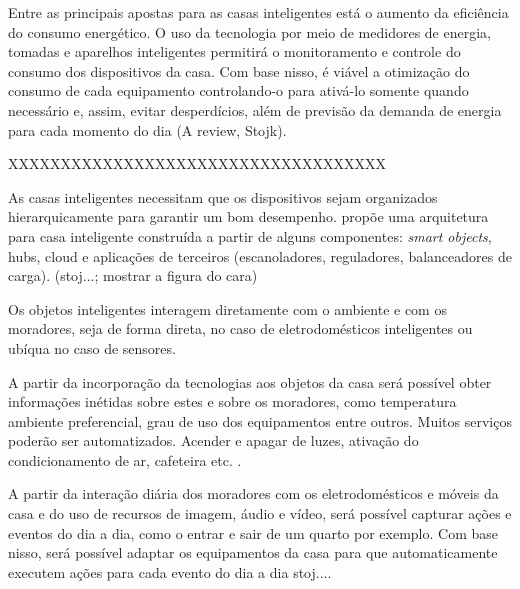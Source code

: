 Entre as principais apostas para as casas inteligentes está o aumento da eficiência do consumo energético. O uso da tecnologia por meio de medidores de energia, tomadas e aparelhos inteligentes permitirá o monitoramento e controle do consumo dos dispositivos da casa. Com base nisso, é viável a otimização do consumo de cada equipamento controlando-o para ativá-lo somente quando necessário e, assim, evitar desperdícios, além de previsão da demanda de energia para cada momento do dia (A review, Stojk).




XXXXXXXXXXXXXXXXXXXXXXXXXXXXXXXXXXXX


As casas inteligentes necessitam que os dispositivos sejam organizados hierarquicamente para garantir um bom desempenho. \citeauthor{stojkoska} propõe uma arquitetura para casa inteligente construída a partir de alguns componentes:  \textit{smart objects}, hubs, cloud e aplicações de terceiros (escanoladores, reguladores, balanceadores de carga).
(stoj...; mostrar a figura do cara)

 Os objetos inteligentes interagem diretamente com o ambiente e com os moradores, seja de forma direta, no caso de eletrodomésticos inteligentes ou ubíqua no caso de sensores.

 A partir da incorporação da tecnologias aos objetos da casa será possível obter informações inétidas sobre estes e sobre os moradores, como temperatura ambiente preferencial, grau de uso dos equipamentos entre outros.
 Muitos serviços poderão ser automatizados. Acender e apagar de luzes, ativação do condicionamento de ar, cafeteira etc. \cite{Silva2012}.


 A partir da interação diária dos moradores com os eletrodomésticos e móveis da casa e do uso de recursos de imagem, áudio e vídeo, será possível capturar ações e eventos do dia a dia, como o entrar e sair de um quarto por exemplo. Com base nisso, será possível adaptar os equipamentos da casa para que automaticamente executem ações para cada evento do dia a dia {stoj...}.

